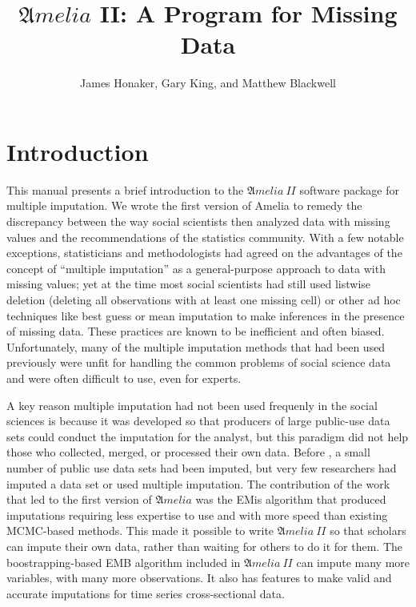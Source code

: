 \documentclass[12pt,titlepage]{article}
\title{${\mathfrak Amelia}$ II: A Program for Missing Data}
\author{James Honaker, Gary King, and Matthew Blackwell}
\newcommand{\Amelia}{\ensuremath{\mathfrak Amelia} }
\newcommand{\AmeliaII}{\ensuremath{\mathfrak Amelia~II} }
\begin{document}
\maketitle

\tableofcontents
\newpage

\section{Introduction}
\label{sec:intro}

This manual presents a brief introduction to the \AmeliaII software
package for multiple imputation.  We wrote the first version of Amelia
to remedy the discrepancy between the way social scientists then
analyzed data with missing values and the recommendations of the
statistics community.  With a few notable exceptions, statisticians
and methodologists had agreed on the advantages of the concept of
``multiple imputation'' as a general-purpose approach to data with
missing values; yet at the time most social scientists had still used
listwise deletion (deleting all observations with at least one missing
cell) or other ad hoc techniques like best guess or mean imputation to
make inferences in the presence of missing data.  These practices are
known to be inefficient and often biased.  Unfortunately, many of the
multiple imputation methods that had been used previously were unfit
for handling the common problems of social science data and were often
difficult to use, even for experts.

A key reason multiple imputation had not been used frequenly in the
social sciences is because it was developed so that producers of large
public-use data sets could conduct the imputation for the analyst, but
this paradigm did not help those who collected, merged, or processed
their own data.  Before \citet*{KinHonJos01}, a small number of public
use data sets had been imputed, but very few researchers had imputed a
data set or used multiple imputation.  The contribution of the work
that led to the first version of \Amelia was the EMis algorithm that
produced imputations requiring less expertise to use and with more
speed than existing MCMC-based methods.  This made it possible to
write \AmeliaII so that scholars can impute their own data, rather
than waiting for others to do it for them.  The boostrapping-based EMB
algorithm included in \AmeliaII can impute many more variables, with
many more observations.  It also has features to make valid and
accurate imputations for time series cross-sectional data.
\end{document}
